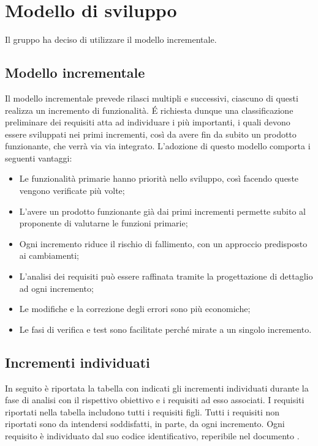 \section{Modello di sviluppo}
Il gruppo ha deciso di utilizzare il modello incrementale.
\subsection{Modello incrementale}
Il modello incrementale prevede rilasci multipli e successivi, ciascuno di questi realizza un incremento di funzionalità.
É richiesta dunque una classificazione preliminare dei requisiti atta ad individuare i più importanti, i quali devono essere sviluppati nei primi incrementi, così da avere fin da subito un prodotto funzionante, che verrà via via integrato.
L'adozione di questo modello comporta i seguenti vantaggi:
\begin{itemize}
\item Le funzionalità primarie hanno priorità nello sviluppo, così facendo queste vengono verificate più volte;
\item L'avere un prodotto funzionante già dai primi incrementi permette subito al proponente di valutarne le funzioni primarie;
\item Ogni incremento riduce il rischio di fallimento, con un approccio predisposto ai cambiamenti;
\item L'analisi dei requisiti può essere raffinata tramite la progettazione di dettaglio ad ogni incremento;
\item Le modifiche e la correzione degli errori sono più economiche;
\item Le fasi di verifica e test sono facilitate perché mirate a un singolo incremento.
\end{itemize}
\subsection{Incrementi individuati}
In seguito è riportata la tabella con indicati gli incrementi individuati durante la fase di analisi con il rispettivo obiettivo e i requisiti ad esso associati.
I requisiti riportati nella tabella includono tutti i requisiti figli. Tutti i requisiti non riportati sono da intendersi soddisfatti, in parte, da ogni incremento.
Ogni requisito è individuato dal suo codice identificativo, reperibile nel documento \AdRv{}.

